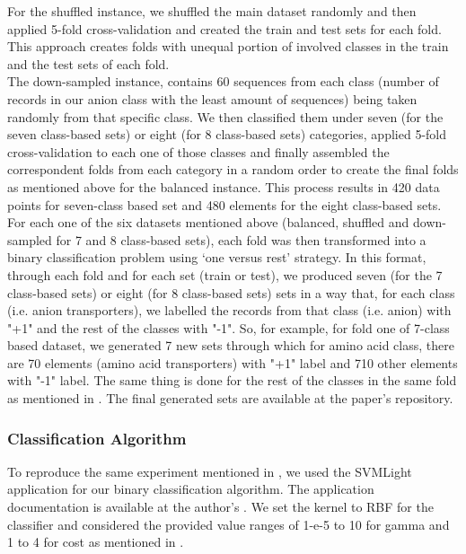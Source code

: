     For the shuffled instance, we shuffled the main dataset randomly and then applied 5-fold cross-validation and created 
    the train and test sets for each fold. This approach creates folds with unequal portion of involved classes in  
    the train and the test sets of each fold. \\

    The down-sampled instance, contains 60 sequences from each class (number of records in our anion class with 
    the least amount of sequences) being taken randomly from that specific class. 
    We then classified them under seven (for the seven class-based sets) or eight (for 8 class-based sets) categories, 
    applied 5-fold cross-validation to each one of those classes and finally assembled the correspondent folds 
    from each category in a random order to create the final folds as mentioned above for the balanced instance. 
    This process results in 420 data points for seven-class based set and 480 elements for the eight class-based sets.\\


    For each one of the six datasets mentioned above (balanced, shuffled and down-sampled for 7 and 8 class-based sets), 
    each fold was then transformed into a binary classification problem using `one versus rest' strategy.
    In this format, through each fold and for each set (train or test), we produced seven (for the 7 class-based sets) 
    or eight (for 8 class-based sets) sets in a way that, for each class (i.e. anion transporters), 
    we labelled the records from that class (i.e. anion) with "+1" and the rest of the classes with "-1". 
    So, for example, for fold one of 7-class based dataset, we generated 7 new sets through which for amino acid class, 
    there are 70 elements (amino acid transporters) with "+1" label and 710 other elements with "-1" label. 
    The same thing is done for the rest of the classes in the same fold as mentioned in \cite{mishra2014prediction}. 
    The final generated sets are available at the paper’s  repository. \\


    \subsubsection{Classification Algorithm}
    \label{sec:svmclassification}
    To reproduce the same experiment mentioned in \cite{mishra2014prediction}, we used the SVMLight application
    for our binary classification algorithm. The application documentation is available at the author's . 
    We set the kernel to RBF for the classifier and considered the provided value ranges of 
    1-e-5 to 10 for gamma and 1 to 4 for cost as mentioned in \cite{mishra2014prediction}.\\

